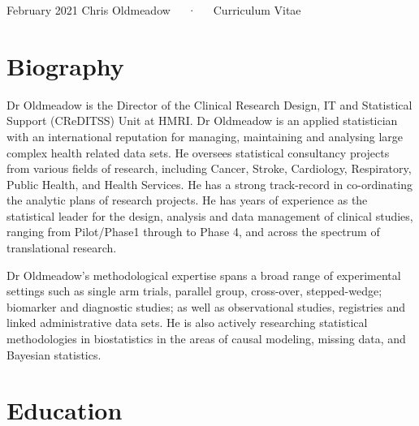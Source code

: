 \documentclass[11pt, a4paper]{awesome-cv}
\begin{document}
\makecvheader

\makecvfooter
  {February 2021}
    {Chris Oldmeadow~~~·~~~Curriculum Vitae}
  {\thepage}





\hypertarget{biography}{%
\section{Biography}\label{biography}}

Dr Oldmeadow is the Director of the Clinical Research Design, IT and
Statistical Support (CReDITSS) Unit at HMRI. Dr Oldmeadow is an applied
statistician with an international reputation for managing, maintaining
and analysing large complex health related data sets. He oversees
statistical consultancy projects from various fields of research,
including Cancer, Stroke, Cardiology, Respiratory, Public Health, and
Health Services. He has a strong track-record in co-ordinating the
analytic plans of research projects. He has years of experience as the
statistical leader for the design, analysis and data management of
clinical studies, ranging from Pilot/Phase1 through to Phase 4, and
across the spectrum of translational research.

Dr Oldmeadow's methodological expertise spans a broad range of
experimental settings such as single arm trials, parallel group,
cross-over, stepped-wedge; biomarker and diagnostic studies; as well as
observational studies, registries and linked administrative data sets.
He is also actively researching statistical methodologies in
biostatistics in the areas of causal modeling, missing data, and
Bayesian statistics.

\hypertarget{education}{%
\section{Education}\label{education}}
\end{document}
